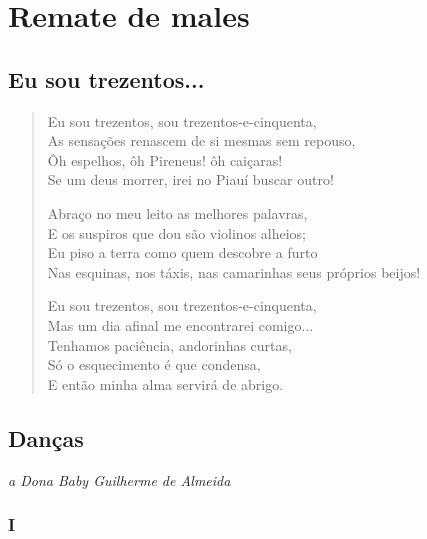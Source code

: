 \part{Remate de males}
\removeepigraph


\chapter[Eu sou trezentos...]{Eu sou trezentos... }

\begin{verse}
Eu sou trezentos, sou trezentos-e-cinquenta,\\
As sensações renascem de si mesmas sem repouso,\\
Ôh espelhos, ôh Pireneus! ôh caiçaras!\\
Se um deus morrer, irei no Piauí buscar outro!

Abraço no meu leito as melhores palavras,\\
E os suspiros que dou são violinos alheios;\\
Eu piso a terra como quem descobre a furto\\
Nas esquinas, nos táxis, nas camarinhas seus próprios beijos!

Eu sou trezentos, sou trezentos-e-cinquenta,\\
Mas um dia afinal me encontrarei comigo...\\
Tenhamos paciência, andorinhas curtas,\\
Só o esquecimento é que condensa,\\
E então minha alma servirá de abrigo.
\end{verse}

\chapter[Danças]{Danças }


\begin{flushright}
\emph{a Dona Baby Guilherme de Almeida}
\end{flushright}

\section{I}

